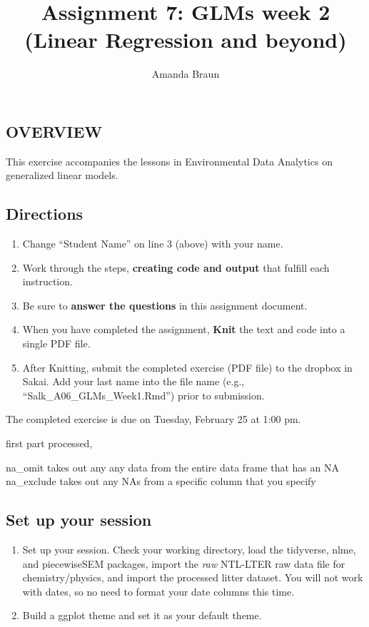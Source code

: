 \documentclass[]{article}
\title{Assignment 7: GLMs week 2 (Linear Regression and beyond)}
\author{Amanda Braun}
\date{}
\providecommand{\tightlist}{%
  \setlength{\itemsep}{0pt}\setlength{\parskip}{0pt}}
\begin{document}
\maketitle

\hypertarget{overview}{%
\subsection{OVERVIEW}\label{overview}}

This exercise accompanies the lessons in Environmental Data Analytics on
generalized linear models.

\hypertarget{directions}{%
\subsection{Directions}\label{directions}}

\begin{enumerate}
\def\labelenumi{\arabic{enumi}.}
\tightlist
\item
  Change ``Student Name'' on line 3 (above) with your name.
\item
  Work through the steps, \textbf{creating code and output} that fulfill
  each instruction.
\item
  Be sure to \textbf{answer the questions} in this assignment document.
\item
  When you have completed the assignment, \textbf{Knit} the text and
  code into a single PDF file.
\item
  After Knitting, submit the completed exercise (PDF file) to the
  dropbox in Sakai. Add your last name into the file name (e.g.,
  ``Salk\_A06\_GLMs\_Week1.Rmd'') prior to submission.
\end{enumerate}

The completed exercise is due on Tuesday, February 25 at 1:00 pm.

first part processed,

na\_omit takes out any any data from the entire data frame that has an
NA na\_exclude takes out any NAs from a specific column that you specify

\hypertarget{set-up-your-session}{%
\subsection{Set up your session}\label{set-up-your-session}}

\begin{enumerate}
\def\labelenumi{\arabic{enumi}.}
\item
  Set up your session. Check your working directory, load the tidyverse,
  nlme, and piecewiseSEM packages, import the \emph{raw} NTL-LTER raw
  data file for chemistry/physics, and import the processed litter
  dataset. You will not work with dates, so no need to format your date
  columns this time.
\item
  Build a ggplot theme and set it as your default theme.
\end{enumerate}
\end{document}
